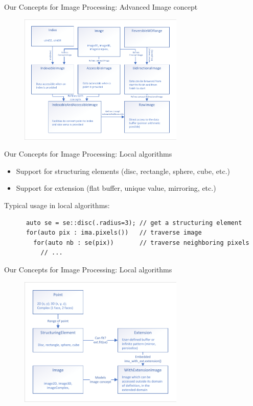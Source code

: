 \documentclass[12pt,aspectratio=169]{beamer}
\begin{document}
\begin{frame}[fragile]{Our Concepts for Image Processing: Advanced Image concept}
  \centering
  \begin{figure}
    \includegraphics[width=0.7\textwidth]{../figures/concepts/images_all}
  \end{figure}
\end{frame}


\begin{frame}[fragile]{Our Concepts for Image Processing: Local algorithms}
  \begin{itemize}
    \item Support for structuring elements (disc, rectangle, sphere, cube, etc.)
    \item Support for extension (flat buffer, unique value, mirroring, etc.)
  \end{itemize}
  Typical usage in local algorithms:

  \begin{verbatim}
      auto se = se::disc(.radius=3); // get a structuring element
      for(auto pix : ima.pixels())   // traverse image
        for(auto nb : se(pix))       // traverse neighboring pixels
          // ...
  \end{verbatim}
\end{frame}

\begin{frame}[fragile]{Our Concepts for Image Processing: Local algorithms}
  \centering
  \begin{figure}
    \includegraphics[width=0.7\textwidth]{../figures/concepts/se_extension}
  \end{figure}
\end{frame}
\end{document}
